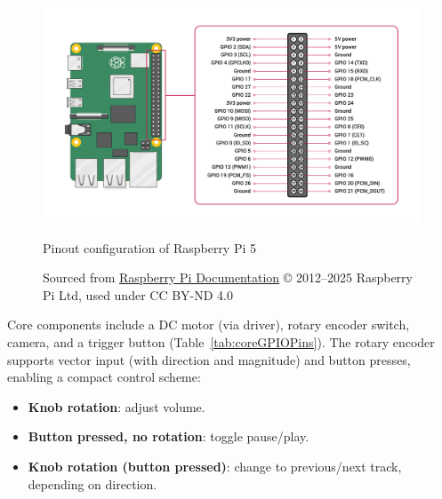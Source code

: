                 \begin{figure}[htbp]
                    \centering
                    \includegraphics[width=\linewidth]{images/raspberry-pi-5-pinout.png}
                    \caption{Pinout configuration of Raspberry Pi 5}
                    \label{fig:RPi5Pinout}
                    \caption*{Sourced from \href{https://www.raspberrypi.com/documentation/computers/raspberry-pi.html#gpio}{Raspberry Pi Documentation} © 2012–2025 Raspberry Pi Ltd, used under CC BY-ND 4.0}
                \end{figure}
    
                Core components include a DC motor (via driver), rotary encoder switch, camera, and a trigger button (Table~\ref{tab:coreGPIOPins}). The rotary encoder supports vector input (with direction and magnitude) and button presses, enabling a compact control scheme:
    
                \begin{itemize}
                    \item \textbf{Knob rotation}: adjust volume.
                    \item \textbf{Button pressed, no rotation}: toggle pause/play.
                    \item \textbf{Knob rotation (button pressed)}: change to previous/next track, depending on direction.
                \end{itemize}
    
